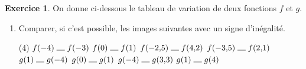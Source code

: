 \documentclass{article}
\theoremstyle{definition}
\newtheorem{exercice}{Exercice}
\begin{document}
\newpage

\begin{exercice}
    On donne ci-dessous le tableau de variation de deux fonctions $f$ et $g$.

    \noindent
    \begin{minipage}[t]{0.45\linewidth}
      \centering
    \end{minipage}\hfill
    \begin{minipage}[t]{0.45\linewidth}
      \centering
    \end{minipage}
  
    \vspace{1ex}
    \begin{enumerate}[label=\arabic*.]
      \item Comparer, si c’est possible, les images suivantes avec un signe d’inégalité.
      \begin{tasks}(4)
      \task $f(-4)\;\rule{1em}{.15mm}\;f(-3)$  
      \task $f(0)\;\rule{1em}{.15mm}\;f(1)$  
      \task $f(-2{,}5)\;\rule{1em}{.15mm}\;f(4{,}2)$  
      \task $f(-3{,}5)\;\rule{1em}{.15mm}\;f(2{,}1)$  
      \task $g(1)\;\rule{1em}{.15mm}\;g(-4)$  
      \task $g(0)\;\rule{1em}{.15mm}\;g(1)$  
      \task $g(-4)\;\rule{1em}{.15mm}\;g(3{,}3)$  
      \task $g(1)\;\rule{1em}{.15mm}\;g(4)$
      \end{tasks}



\end{enumerate}
\end{exercice}
\end{document}
